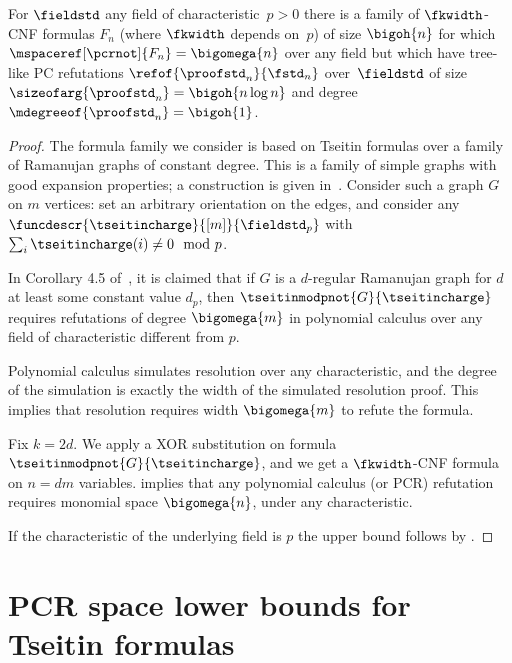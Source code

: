 \documentclass{toc}
\begin{document}
\begin{theorem}
  For $\fieldstd$ any field of characteristic~$p>0$
  there is a family of
  \mbox{$\fkwidth$-CNF} formulas
  $F_n$
  (where $\fkwidth$ depends on~$p$)
  of size $\bigoh{n}$
  for which
%
  $\mspaceref[\pcrnot]{F_{n}}=\bigomega{n}$
  over any field
  but  which have tree-like PC refutations
  $\refof{\proofstd_n}{\fstd_n}$ 
  over~$\fieldstd$
  of size
  $\sizeofarg{\proofstd_n}=\bigoh{n\log n}$
  and degree
  $\mdegreeof{\proofstd_n}=\bigoh{1}$.
\end{theorem}
\begin{proof}
  The formula family we consider is based on Tseitin formulas over a
  family of Ramanujan graphs of constant degree. This is a family of
  simple graphs with good expansion properties; a construction is
  given in~\cite{Morgenstern1994}.  Consider such a graph $G$ on $m$
  vertices: set an arbitrary orientation on the edges, and consider
  any $\funcdescr{\tseitincharge}{[m]}{\fieldstd_p}$ with
  $\sum_{i}\tseitincharge(i)\not=0 \mod{p}$.
  
  In Corollary 4.5 of~\cite{AR03LowerBounds}, it is claimed that if
  $G$ is a $d$-regular Ramanujan graph for $d$ at least some constant value
  $d_{p}$, then $\tseitinmodpnot{G}{\tseitincharge}$ requires
  refutations of degree $\bigomega{m}$ in polynomial calculus over any
  field of characteristic different from $p$.

  Polynomial calculus simulates resolution over any characteristic,
  and the degree of the simulation is exactly the width of the
  simulated resolution proof. This implies that resolution requires
  width $\bigomega{m}$ to refute the formula.

  Fix $k=2d$. We apply a XOR substitution on formula
  $\tseitinmodpnot{G}{\tseitincharge}$, and 
  we get a $\fkwidth$-CNF formula on $n=dm$
  variables.  implies that any polynomial calculus (or PCR) refutation requires monomial space $\bigomega{n}$, under
  any characteristic.

  If the characteristic of the underlying field is $p$ the upper bound
  follows by .
\end{proof}

%
%
%
\section{PCR space lower bounds for Tseitin formulas}
\label{sec:small-cycles}
\end{document}
